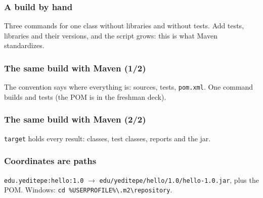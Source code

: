\documentclass[aspectratio=169,10pt,compress]{beamer}
\begin{document}
\begin{frame}[t,fragile] \frametitle{A build by hand}

  \vspace{0.1em}
  \small
  Three commands for one class without libraries and without tests. Add tests, libraries and their versions, and the script grows: this is what Maven standardizes.
\end{frame}




\begin{frame}[t,fragile] \frametitle{The same build with Maven (1/2)}

  \vspace{0.1em}
  \small The convention says where everything is: sources, tests, \texttt{pom.xml}. One command builds and tests (the POM is in the freshman deck).
\end{frame}




\begin{frame}[t,fragile] \frametitle{The same build with Maven (2/2)}

  \vspace{0.1em}
  \small \texttt{target} holds every result: classes, test classes, reports and the jar.
\end{frame}





\begin{frame}[t,fragile] \frametitle{Coordinates are paths}

  \vspace{0.1em}
  \small
  \texttt{edu.yeditepe:hello:1.0} $\to$ \texttt{edu/yeditepe/hello/1.0/hello-1.0.jar}, plus the POM. Windows: \texttt{cd \%USERPROFILE\%\textbackslash .m2\textbackslash repository}.
\end{frame}
\end{document}

